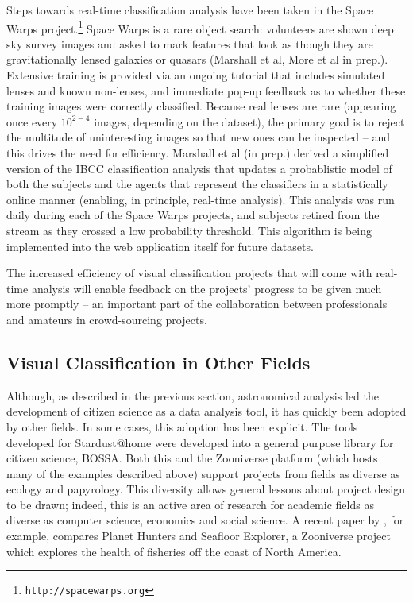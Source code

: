 \documentclass{ar2e}
\def\CaseStudy#1{\noindent{\it\bf #1 \,\,\,\,}}
\def\url#1{\texttt{#1}}
\begin{document}
\CaseStudy{Rare event detection: Space Warps} 
Steps towards real-time classification analysis have been taken in the Space
Warps project.\footnote{\url{http://spacewarps.org}} 
Space Warps is a rare object search: volunteers are shown deep
sky survey images and asked to mark features that look as though they are
gravitationally lensed galaxies or quasars (Marshall et al, More et al in prep.).
Extensive training is
provided via an ongoing tutorial that includes simulated lenses and known
non-lenses, and immediate pop-up feedback as to whether these training images
were correctly classified. Because real lenses are rare (appearing once every
$10^{2-4}$ images, depending on the dataset), the primary goal is to reject the
multitude of uninteresting images so that new ones can be inspected -- and this
drives the need for efficiency. Marshall et al (in prep.) derived a
simplified version of the IBCC classification analysis that updates a
probablistic model of both the subjects and the agents that represent the
classifiers in a statistically online manner (enabling, in principle, real-time
analysis). This
analysis was run daily during each of the Space Warps projects, and subjects
retired from the stream as they crossed a low probability threshold. This
algorithm is being implemented into the web application itself for future
datasets. 

The increased  efficiency of visual classification projects that will come with
real-time analysis will enable feedback on the projects' progress to be given
much more promptly -- an important part of the collaboration between
professionals and amateurs in crowd-sourcing projects.



\subsection{Visual Classification in Other Fields}
\label{sec:class:non-astro}

Although, as described in the previous section, astronomical analysis led the
development of citizen science as a data analysis tool, it has quickly been
adopted by other fields. In some cases, this adoption has been explicit. The
tools developed for Stardust@home were developed into a general purpose
library for citizen science, BOSSA.
Both this and the Zooniverse platform (which hosts many of the examples
described above) support projects from fields as diverse as ecology and
papyrology. This diversity allows general lessons about project
design to be drawn; indeed, this is an active area of research for academic
fields as diverse as computer science, economics and social science. A recent paper
by \citet{Mugar}, for example, compares Planet Hunters and Seafloor Explorer, 
a Zooniverse project which explores the health of fisheries off the coast of
North America. 
\end{document}
